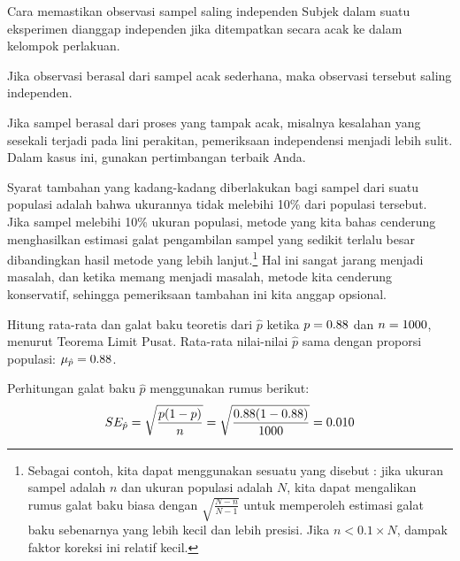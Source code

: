 \begin{onebox}{Cara memastikan observasi sampel saling independen}
  Subjek dalam suatu eksperimen dianggap independen
  jika ditempatkan secara acak ke dalam kelompok
  perlakuan.\stdvspace{}

  Jika observasi berasal dari sampel acak sederhana,
  maka observasi tersebut saling independen.\stdvspace{}

  Jika sampel berasal dari proses yang tampak acak,
  misalnya kesalahan yang sesekali terjadi pada lini perakitan,
  pemeriksaan independensi menjadi lebih sulit. Dalam kasus ini,
  gunakan pertimbangan terbaik Anda.
\end{onebox}

Syarat tambahan yang kadang-kadang diberlakukan bagi sampel
dari suatu populasi adalah bahwa ukurannya tidak melebihi 10\%
dari populasi tersebut.
Jika sampel melebihi 10\% ukuran populasi,
metode yang kita bahas cenderung menghasilkan estimasi galat pengambilan
sampel yang sedikit terlalu besar dibandingkan hasil metode
yang lebih lanjut.\footnote{Sebagai contoh, kita dapat menggunakan sesuatu yang disebut
  :
  jika ukuran sampel adalah $n$ dan ukuran populasi adalah $N$,
  kita dapat mengalikan rumus galat baku biasa dengan
  $\sqrt{\frac{N-n}{N-1}}$
  untuk memperoleh estimasi galat baku sebenarnya yang
  lebih kecil dan lebih presisi.
  Jika $n < 0.1 \times N$, dampak faktor koreksi ini
  relatif kecil.}
Hal ini sangat jarang menjadi masalah, dan ketika memang menjadi masalah,
metode kita cenderung konservatif, sehingga pemeriksaan
tambahan ini kita anggap opsional.

\begin{examplewrap}
\begin{nexample}{Hitung rata-rata dan galat baku teoretis
dari $\hat{p}$ ketika
$p = 0.88{}$ dan $n = 1000{}$,
menurut
Teorema Limit Pusat.}\label{sample_p88_n1000_mean_se}
Rata-rata nilai-nilai $\hat{p}$ sama dengan proporsi populasi:
$\mu_{\hat{p}} = 0.88{}$.

Perhitungan galat baku $\hat{p}$ menggunakan
rumus berikut:
\begin{align*}
SE_{\hat{p}}
    = \sqrt{\frac{p (1 - p)}{n}}
    = \sqrt{\frac{0.88{} (1 - 0.88{})}
        {1000{}}}
    = 0.010{}
\end{align*}
\end{nexample}
\end{examplewrap}

